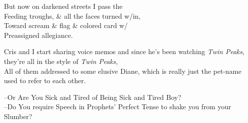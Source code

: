 \secdiv



\secdiv


 
\secdiv



\secdiv



\secdiv



\secdiv



\newpage

\secdiv



\secdiv

But now on darkened streets I pass the \\ 
Feeding troughs, \& all the faces turned w/in, \\
Toward scream \& flag \& colored card w/ \\
Preassigned allegiance.

\secdiv



\secdiv



\secdiv



\secdiv

Cris and I start sharing voice memos and since he's been watching \textit{Twin Peaks}, they're all in the style of \textit{Twin Peaks}, \\
All of them addressed to some elusive Diane, which is really just the pet-name used to refer to each other.



\secdiv



\secdiv

--Or Are You Sick and Tired of Being Sick and Tired Boy? \\
--Do You require Speech in Prophets' Perfect Tense to shake you from your Slumber?

